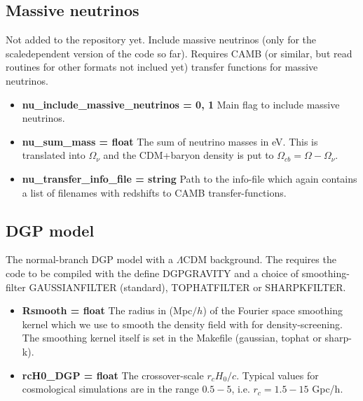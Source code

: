 \documentclass[usenatbib]{article}
\begin{document}
\subsection*{Massive neutrinos}

Not added to the repository yet. Include massive neutrinos (only for the scaledependent version of the code so far). Requires CAMB (or similar, but read routines for other formats not inclued yet) transfer functions for massive neutrinos.

\begin{itemize}

\item \textbf{nu\_include\_massive\_neutrinos = 0, 1} Main flag to include massive neutrinos.

\item \textbf{nu\_sum\_mass = float} The sum of neutrino masses in eV. This is translated into $\Omega_\nu$ and the CDM+baryon density is put to $\Omega_{cb} = \Omega - \Omega_\nu$.

\item \textbf{nu\_transfer\_info\_file = string} Path to the info-file which again contains a list of filenames with redshifts to CAMB transfer-functions.

\end{itemize}

\subsection*{DGP model}

The normal-branch DGP model with a $\Lambda$CDM background. The requires the code to be compiled with the define DGPGRAVITY and a choice of smoothing-filter GAUSSIANFILTER (standard), TOPHATFILTER or SHARPKFILTER.

\begin{itemize}

\item \textbf{Rsmooth = float} The radius in (Mpc$/h$) of the Fourier space smoothing kernel which we use to smooth the density field with for density-screening. The smoothing kernel itself is set in the Makefile (gaussian, tophat or sharp-k).

\item \textbf{rcH0\_DGP = float} The crossover-scale $r_cH_0/c$. Typical values for cosmological simulations are in the range $0.5-5$, i.e. $r_c = 1.5 - 15$ Gpc/h.

\end{itemize}
\end{document}
